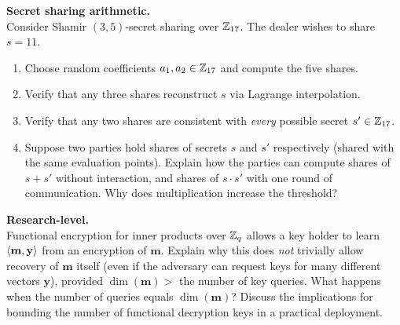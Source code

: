 \begin{prob}
\label{prob:ch14-shamir}
\textbf{Secret sharing arithmetic.}\\
Consider Shamir $(3, 5)$-secret sharing over $\mathbb{Z}_{17}$.  The dealer wishes to share $s = 11$.
\begin{enumerate}
\item[(a)] Choose random coefficients $a_1, a_2 \in \mathbb{Z}_{17}$ and compute the five shares.
\item[(b)] Verify that any three shares reconstruct $s$ via Lagrange interpolation.
\item[(c)] Verify that any two shares are consistent with \emph{every} possible secret $s' \in \mathbb{Z}_{17}$.
\item[(d)] Suppose two parties hold shares of secrets $s$ and $s'$ respectively (shared with the same evaluation points).  Explain how the parties can compute shares of $s + s'$ without interaction, and shares of $s \cdot s'$ with one round of communication.  Why does multiplication increase the threshold?
\end{enumerate}
\end{prob}

\begin{prob}
\label{prob:ch14-advanced}
\textbf{Research-level.}\\
Functional encryption for inner products over $\mathbb{Z}_q$ allows a key holder to learn $\left\langle \mathbf{m}, \mathbf{y} \right\rangle$ from an encryption of $\mathbf{m}$.  Explain why this does \emph{not} trivially allow recovery of $\mathbf{m}$ itself (even if the adversary can request keys for many different vectors $\mathbf{y}$), provided $\dim(\mathbf{m}) > $ the number of key queries.  What happens when the number of queries equals $\dim(\mathbf{m})$?  Discuss the implications for bounding the number of functional decryption keys in a practical deployment.
\end{prob}

